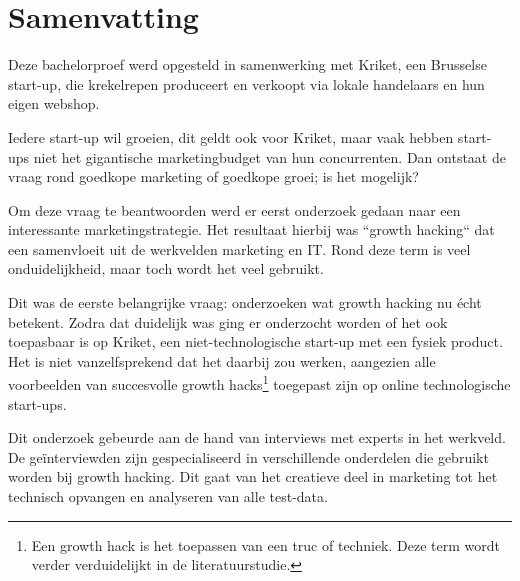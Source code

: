 
%
%


\chapter{Samenvatting}

Deze bachelorproef werd opgesteld in samenwerking met Kriket, een Brusselse start-up, die krekelrepen produceert en verkoopt via lokale handelaars en hun eigen webshop. 

Iedere start-up wil groeien, dit geldt ook voor Kriket, maar vaak hebben start-ups niet het gigantische marketingbudget van hun concurrenten. Dan ontstaat de vraag rond goedkope marketing of goedkope groei; is het mogelijk?

Om deze vraag te beantwoorden werd er eerst onderzoek gedaan naar een interessante marketingstrategie. Het resultaat hierbij was ``growth hacking`` dat een samenvloeit uit de werkvelden marketing en IT. Rond deze term is veel onduidelijkheid, maar toch wordt het veel gebruikt.

Dit was de eerste belangrijke vraag: onderzoeken wat growth hacking nu écht betekent. Zodra dat duidelijk was ging er onderzocht worden of het ook toepasbaar is op Kriket, een niet-technologische start-up met een fysiek product. Het is niet vanzelfsprekend dat het daarbij zou werken, aangezien alle voorbeelden van succesvolle growth hacks\footnote{Een growth hack is het toepassen van een truc of techniek. Deze term wordt verder verduidelijkt in de literatuurstudie.} toegepast zijn op online technologische start-ups.

Dit onderzoek gebeurde aan de hand van interviews met experts in het werkveld. De geïnterviewden zijn gespecialiseerd in verschillende onderdelen die gebruikt worden bij growth hacking. Dit gaat van het creatieve deel in marketing tot het technisch opvangen en analyseren van alle test-data. 

